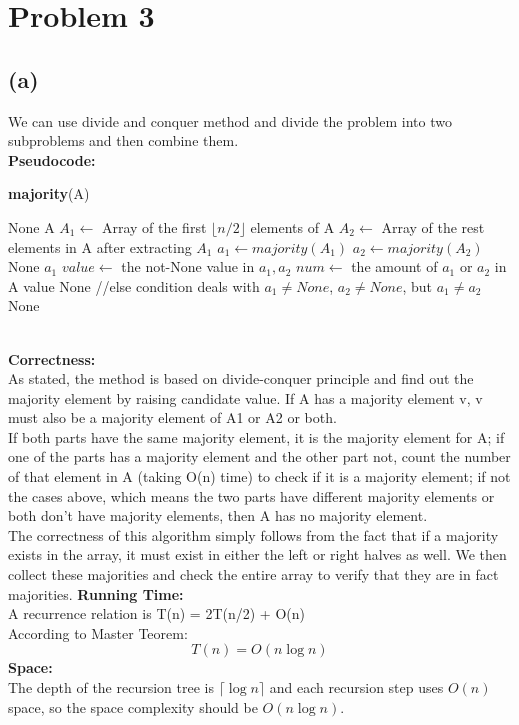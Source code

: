 \documentclass[twoside]{homework}
\begin{document}
\section*{Problem 3}
\subsection*{(a)}
We can use divide and conquer method and divide the problem into two subproblems and then combine them.\\
\textbf{Pseudocode:}
\begin{algorithm}
	\caption*{\textbf{majority}(A)}
	\begin{algorithmic}
		\RETURN None
		\ENDIF
		\RETURN A
		\ENDIF
		\STATE $A_1 \leftarrow$ Array of the first $\lfloor n/2\rfloor$ elements of A
		\STATE $A_2 \leftarrow$ Array of the rest elements in A after extracting $A_1$
		\STATE $a_1 \leftarrow majority(A_1)$
		\STATE $a_2 \leftarrow majority(A_2)$
		\RETURN None
		\RETURN $a_1$
		\STATE $value \leftarrow$ the not-None value in $a_1,a_2$
		\STATE $num \leftarrow$ the amount of $a_1$ or $a_2$ in A
		\RETURN value
		\ENDIF
		\RETURN None
		\ELSE
		\STATE //else condition deals with $a_1\neq None$, $a_2\neq None$, but $a_1\neq a_2$
		\RETURN None
		\ENDIF
	\end{algorithmic}
\end{algorithm}
\\\textbf{Correctness:}\\
As stated, the method is based on divide-conquer principle and find out the majority element by raising candidate value. If A has a majority element v, v must also be a majority element of A1 or A2 or both.\\
If both parts have the same majority element, it is the majority element for A; if one of the parts has a majority element and the other part not, count the number of that element in A (taking O(n) time) to check if it is a majority element; if not the cases above, which means the two parts have different majority elements or both don't have majority elements, then A has no majority element.
\\The correctness of this algorithm simply follows from the fact that if a majority exists in the array, it must exist in either the left or right halves as well. We then collect these majorities and check the entire array to verify that they are in fact majorities. 
\textbf{Running Time:}
\\A recurrence relation is T(n) = 2T(n/2) + O(n)\\
According to Master Teorem:
$$T(n)=O (n\log n)$$
\textbf{Space:}\\
The depth of the recursion tree is $\lceil \log n\rceil$ and each recursion step uses $O(n)$ space, so the space complexity should be $O(n\log n)$.
\end{document}
